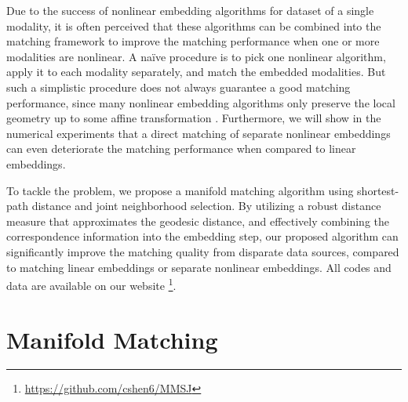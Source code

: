 \documentclass[times,twocolumn,final]{elsarticle}
\begin{document}
Due to the success of nonlinear embedding algorithms for dataset of a single modality, it is often perceived that these algorithms can be combined into the matching framework to improve the matching performance when one or more modalities are nonlinear. A na\"ive procedure is to pick one nonlinear algorithm, apply it to each modality separately, and match the embedded modalities. But such a simplistic procedure does not always guarantee a good matching performance, since many nonlinear embedding algorithms only preserve the local geometry up to some affine transformation \citep{GoldbergRitov2008}. Furthermore, we will show in the numerical experiments that a direct matching of separate nonlinear embeddings can even deteriorate the matching performance when compared to linear embeddings.

To tackle the problem, we propose a manifold matching algorithm using shortest-path distance and joint neighborhood selection. By utilizing a robust distance measure that approximates the geodesic distance, and effectively combining the correspondence information into the embedding step, our proposed algorithm can significantly improve the matching quality from disparate data sources, compared to matching linear embeddings or separate nonlinear embeddings. All codes and data are available on our website \footnote{\url{https://github.com/cshen6/MMSJ}}.%


\section{Manifold Matching}
\label{main}
\end{document}
